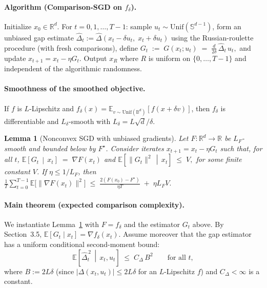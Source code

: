 \documentclass[11pt]{article}
\theoremstyle{plain}
\newtheorem{lemma}[theorem]{Lemma}
\theoremstyle{remark}
\newcommand{\R}{\mathbb{R}}
\newcommand{\E}{\mathbb{E}}
\newcommand{\1}{\mathbf{1}}
\begin{document}
\paragraph{Algorithm (Comparison-SGD on $f_\delta$).}
Initialize $x_0\in\R^d$. For $t=0,1,\dots,T-1$:
sample $u_t\sim \mathrm{Unif}(\mathbb{S}^{d-1})$, form an unbiased gap estimate
$\widehat{\Delta}_t := \widehat{\Delta}(x_t-\delta u_t,\;x_t+\delta u_t)$ using the
Russian-roulette procedure (with fresh comparisons), define
$
G_t \;:=\; G(x_t;u_t)\;=\;\frac{d}{2\delta}\,\widehat{\Delta}_t\,u_t,
$
and update $x_{t+1}=x_t-\eta G_t$. Output $x_R$ where $R$ is uniform on $\{0,\dots,T-1\}$
and independent of the algorithmic randomness.






\paragraph{Smoothness of the smoothed objective.}
If $f$ is $L$-Lipschitz and $f_\delta(x)=\E_{v\sim\mathrm{Unif}(\mathbb{B}^d)}[f(x+\delta v)]$,
then $f_\delta$ is differentiable and $L_\delta$-smooth with $L_\delta = L\sqrt d/\delta$.

\begin{propbox}
\begin{lemma}[Nonconvex SGD with unbiased gradients]
\label{lem:sgd_generic}
Let $F:\R^d\to\R$ be $L_F$-smooth and bounded below by $F^\star$.
Consider iterates $x_{t+1}=x_t-\eta G_t$ such that, for all $t$,
$
\E\!\left[G_t\,\middle|\,x_t\right] \;=\; \nabla F(x_t)$ and
$\E\!\left[\|G_t\|^2\,\middle|\,x_t\right] \;\le\; V,$
for some finite constant $V$. If $\eta\le 1/L_F$, then
$
\frac{1}{T}\sum_{t=0}^{T-1}\E\big[\|\nabla F(x_t)\|^2\big]
\;\le\; \frac{2(F(x_0)-F^\star)}{\eta T} \;+\; \eta L_F V.
$

\end{lemma}
\end{propbox}
\par\smallskip

\paragraph{Main theorem (expected comparison complexity).}
We instantiate Lemma~\ref{lem:sgd_generic} with $F=f_\delta$ and the estimator $G_t$ above.
By Section~3.5, $\E[G_t\mid x_t]=\nabla f_\delta(x_t)$.
Assume moreover that the gap estimator has a uniform conditional second-moment bound:
\begin{equation}
\label{eq:gap_second_moment}
\E\!\left[\widehat{\Delta}_t^{\,2}\,\middle|\,x_t,u_t\right] \;\le\; C_\Delta\,B^2
\qquad\text{for all }t,
\end{equation}
where $B:=2L\delta$ (since $|\Delta(x_t,u_t)|\le 2L\delta$ for an $L$-Lipschitz $f$)
and $C_\Delta<\infty$ is a constant.
\end{document}
